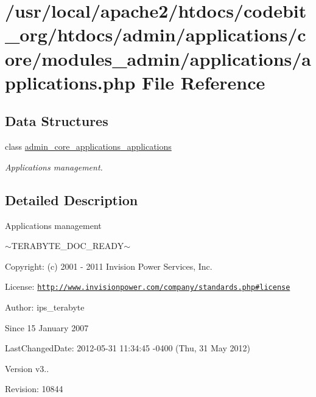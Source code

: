 \hypertarget{applications_8php}{\section{/usr/local/apache2/htdocs/codebit\-\_\-org/htdocs/admin/applications/core/modules\-\_\-admin/applications/applications.php File Reference}
\label{applications_8php}
}
\subsection*{Data Structures}
\begin{DoxyCompactItemize}
\item 
class \hyperlink{classadmin__core__applications__applications}{admin\-\_\-core\-\_\-applications\-\_\-applications}
\begin{DoxyCompactList}\small\item\em Applications management. \end{DoxyCompactList}\end{DoxyCompactItemize}


\subsection{Detailed Description}
\begin{DoxyVerb}  Applications management
\end{DoxyVerb}
 $\sim$\-T\-E\-R\-A\-B\-Y\-T\-E\-\_\-\-D\-O\-C\-\_\-\-R\-E\-A\-D\-Y$\sim$ \begin{DoxyParagraph}{Copyright\-:}
(c) 2001 -\/ 2011 Invision Power Services, Inc.
\end{DoxyParagraph}
\begin{DoxyParagraph}{License\-:}
\href{http://www.invisionpower.com/company/standards.php#license}{\tt http\-://www.\-invisionpower.\-com/company/standards.\-php\#license}
\end{DoxyParagraph}
\begin{DoxyParagraph}{Author\-:}
ips\-\_\-terabyte 
\end{DoxyParagraph}
\begin{DoxySince}{Since}
15 January 2007 
\end{DoxySince}
\begin{DoxyParagraph}{Last\-Changed\-Date\-:}
2012-\/05-\/31 11\-:34\-:45 -\/0400 (Thu, 31 May 2012) 
\end{DoxyParagraph}
\begin{DoxyVersion}{Version}
v3.. 
\end{DoxyVersion}
\begin{DoxyParagraph}{Revision\-:}
10844 
\end{DoxyParagraph}
